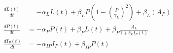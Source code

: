 

%

\begin{eqnarray*}
  \frac{dL(t)}{dt} &= -\alpha_{L}L(t) + \beta_{L}P\left(1-\left(\frac{P}{\gamma_{L}}\right)^{2}\right) + \beta_{L}(A_{P}) \\
  \frac{dP(t)}{dt} &= -\alpha_{P}P(t) + \beta_{P}L(t) + \beta_{P}\frac{A_{L}}{1+\delta_{P}I_{P}(t)} \\
  \frac{dI_{P}(t)}{dt} &= -\alpha_{IP}I_{P}(t) + \beta_{IP}P(t)
\end{eqnarray*}

%


